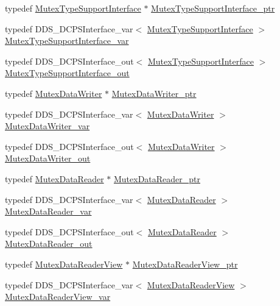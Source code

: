 \begin{DoxyCompactItemize}
\item 
typedef \hyperlink{classKnowledge_1_1MutexTypeSupportInterface}{MutexTypeSupportInterface} $\ast$ \hyperlink{namespaceKnowledge_aa85dec9fa305b0500bb87231aceb2fb0}{MutexTypeSupportInterface\_\-ptr}
\item 
typedef DDS\_\-DCPSInterface\_\-var$<$ \hyperlink{classKnowledge_1_1MutexTypeSupportInterface}{MutexTypeSupportInterface} $>$ \hyperlink{namespaceKnowledge_acaf157b3817dc52861f4ff75fcd3c2d4}{MutexTypeSupportInterface\_\-var}
\item 
typedef DDS\_\-DCPSInterface\_\-out$<$ \hyperlink{classKnowledge_1_1MutexTypeSupportInterface}{MutexTypeSupportInterface} $>$ \hyperlink{namespaceKnowledge_a74243a0d580b4dd8c98e814ddc934733}{MutexTypeSupportInterface\_\-out}
\item 
typedef \hyperlink{classKnowledge_1_1MutexDataWriter}{MutexDataWriter} $\ast$ \hyperlink{namespaceKnowledge_a5ae477a56ef6f9ffbcdccd81230f6ec2}{MutexDataWriter\_\-ptr}
\item 
typedef DDS\_\-DCPSInterface\_\-var$<$ \hyperlink{classKnowledge_1_1MutexDataWriter}{MutexDataWriter} $>$ \hyperlink{namespaceKnowledge_a6883244ee070735ab1d7ad34821094fd}{MutexDataWriter\_\-var}
\item 
typedef DDS\_\-DCPSInterface\_\-out$<$ \hyperlink{classKnowledge_1_1MutexDataWriter}{MutexDataWriter} $>$ \hyperlink{namespaceKnowledge_ab75d517dcae365e51d944ebbaaf1a4ab}{MutexDataWriter\_\-out}
\item 
typedef \hyperlink{classKnowledge_1_1MutexDataReader}{MutexDataReader} $\ast$ \hyperlink{namespaceKnowledge_adb998b7a1d6009cbfe917e56113f10b8}{MutexDataReader\_\-ptr}
\item 
typedef DDS\_\-DCPSInterface\_\-var$<$ \hyperlink{classKnowledge_1_1MutexDataReader}{MutexDataReader} $>$ \hyperlink{namespaceKnowledge_a1af3d1f19c7cf91384b3fb2a37b3258b}{MutexDataReader\_\-var}
\item 
typedef DDS\_\-DCPSInterface\_\-out$<$ \hyperlink{classKnowledge_1_1MutexDataReader}{MutexDataReader} $>$ \hyperlink{namespaceKnowledge_a2ba100a804da335033f0d8b30f5d2df9}{MutexDataReader\_\-out}
\item 
typedef \hyperlink{classKnowledge_1_1MutexDataReaderView}{MutexDataReaderView} $\ast$ \hyperlink{namespaceKnowledge_a9a97ab51ae7a622b17fcfea9041f92f9}{MutexDataReaderView\_\-ptr}
\item 
typedef DDS\_\-DCPSInterface\_\-var$<$ \hyperlink{classKnowledge_1_1MutexDataReaderView}{MutexDataReaderView} $>$ \hyperlink{namespaceKnowledge_ab5f4ad419e160a86a63a5380e0ecaeb9}{MutexDataReaderView\_\-var}

\end{DoxyCompactItemize}

